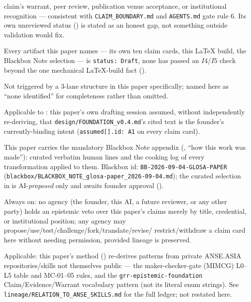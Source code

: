 \begin{disclaimers}
    claim's warrant, peer review, publication venue acceptance, or institutional recognition —
    consistent with \texttt{CLAIM\_BOUNDARY.md} and \texttt{AGENTS.md} gate rule 6. Its own
    unreviewed status () is stated as an honest gap, not something outside
    validation would fix.
  \item[D-CANDIDATE-STATUS] Every artifact this paper names — its own ten claim cards, this LaTeX
    build, the Blackbox Note selection — is \texttt{status: Draft}, none has passed an $I4$/$I5$
    check beyond the one mechanical LaTeX-build fact ().
  \item[D-PARTIAL-SET] Not triggered by a 3-lane structure in this paper specifically; named here
    as ``none identified'' for completeness rather than omitted.
  \item[D-SILENT-LIFT-GUARD] Applicable to : this paper's own drafting session
    assumed, without independently re-deriving, that \texttt{design/FOUNDATION\_v0.4.md}'s cited
    text is the founder's currently-binding intent (\texttt{assumed[].id: A1} on every claim card).
  \item[D-BLACKBOX-NOTE] This paper carries the mandatory Blackbox Note appendix
    (, ``how this work was made''): curated verbatim human lines and the
    cooking log of every transformation applied to them. Blackbox id:
    \texttt{BB-2026-09-04-GLOSA-PAPER} (\texttt{blackbox/BLACKBOX\_NOTE\_glosa-paper\_2026-09-04.md});
    the curated selection in  is AI-\emph{proposed} only and awaits founder
    approval ().
  \item[D-NO-EPISTEMIC-VETO] Always on: no agency (the founder, this AI, a future reviewer, or any
    other party) holds an epistemic veto over this paper's claims merely by title, credential, or
    institutional position; any agency may propose/use/test/challenge/fork/translate/revise/
    restrict/withdraw a claim card here without needing permission, provided lineage is preserved.
  \item[D-DERIVED-PATTERNS] Applicable: this paper's method () re-derives
    patterns from private ANSE.ASIA repositories/skills not themselves public — the
    maker-checker-gate (MIMCG) L0--L5 table and MC-01--05 rules, and the
    \texttt{grr-epistemic-foundation} Claim/Evidence/Warrant vocabulary pattern (not its literal
    enum strings). See \texttt{lineage/RELATION\_TO\_ANSE\_SKILLS.md} for the full ledger; not
    restated here.
\end{disclaimers}
